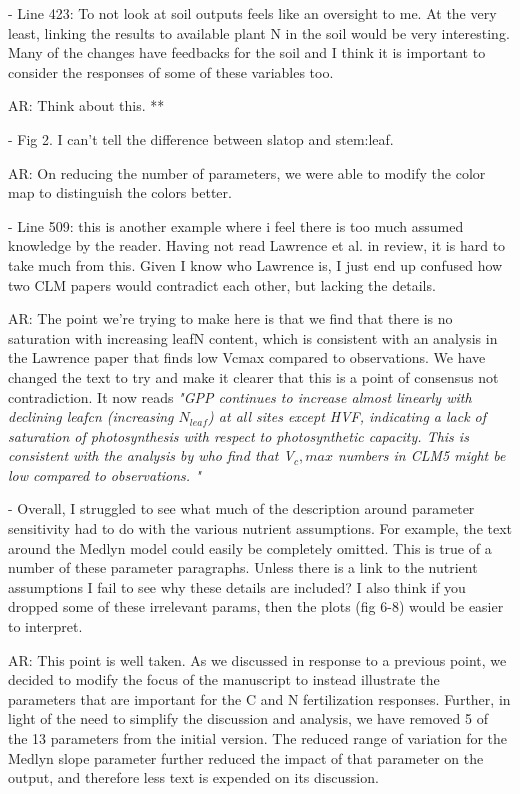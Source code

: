 \documentclass{article}
\begin{document}
- Line 423: To not look at soil outputs feels like an oversight to me. At the very least, linking the results to available plant N in the soil would be very interesting. Many of the changes have feedbacks for the soil and I think it is important to consider the responses of some of these variables too. 

\textsf{AR: Think about this. **}

- Fig 2. I can't tell the difference between slatop and stem:leaf. 

\textsf{AR: On reducing the number of parameters,  we were able to modify the color map to distinguish the colors better.}

- Line 509: this is another example where i feel there is too much assumed knowledge by the reader. Having not read Lawrence et al. in review, it is hard to take much from this. Given I know who Lawrence is, I just end up confused how two CLM papers would contradict each other, but lacking the details. 

\textsf{AR: The point we're trying to make here is that we find that there is no saturation with increasing leafN content, which is consistent with an analysis in the Lawrence paper that finds low Vcmax compared to observations. We have changed the text to try and make it clearer that this is a point of consensus not contradiction. It now reads \emph{"GPP continues to increase almost linearly with declining \emph{leafcn}  (increasing $N_{leaf}$) at all sites except HVF, indicating a lack of saturation of photosynthesis with respect to photosynthetic capacity.  This is consistent with the analysis by \cite{lawrence2018} who find that V${_c,max}$ numbers in CLM5 might be low compared to observations. "}}

- Overall, I struggled to see what much of the description around parameter sensitivity had to do with the various nutrient assumptions. For example, the text around the Medlyn model could easily be completely omitted. This is true of a number of these parameter paragraphs. Unless there is a link to the nutrient assumptions I fail to see why these details are included? I also think if you dropped some of these irrelevant params, then the plots (fig 6-8) would be easier to interpret.

\textsf{AR: This point is well taken. As we discussed in response to a previous point, we decided to modify the focus of the manuscript to instead illustrate the parameters that are important for the C and N fertilization responses. Further, in light of the need to simplify the discussion and analysis, we have removed 5 of the 13 parameters from the initial version. The reduced range of variation for the Medlyn slope parameter further reduced the impact of that parameter on the output, and therefore less text is expended on its discussion.}
\end{document}
